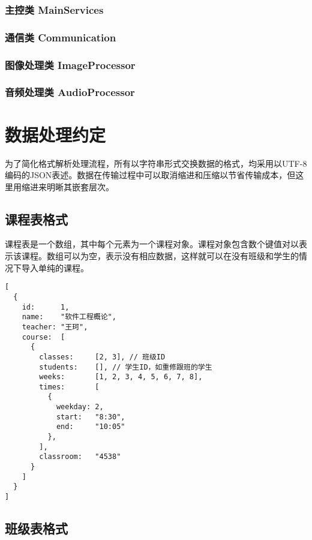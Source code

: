 \documentclass[cs4size,a4paper,nofonts]{ctexart}
\begin{document}
\subsubsection{主控类 MainServices}

\subsubsection{通信类 Communication}

\subsubsection{图像处理类 Image{}Processor}

\subsubsection{音频处理类 Audio{}Processor}

\section{数据处理约定}

为了简化格式解析处理流程，所有以字符串形式交换数据的格式，均采用以UTF-8编码的JSON表述。数据在传输过程中可以取消缩进和压缩以节省传输成本，但这里用缩进来明晰其嵌套层次。

\subsection{课程表格式}\label{sec:课程表格式}

课程表是一个数组，其中每个元素为一个课程对象。课程对象包含数个键值对以表示该课程。数组可以为空，表示没有相应数据，这样就可以在没有班级和学生的情况下导入单纯的课程。

\begin{Verbatim}
[
  {
    id:      1,
    name:    "软件工程概论",
    teacher: "王珂",
    course:  [
      {
        classes:     [2, 3], // 班级ID
        students:    [], // 学生ID，如重修跟班的学生
        weeks:       [1, 2, 3, 4, 5, 6, 7, 8],
        times:       [
          {
            weekday: 2,
            start:   "8:30",
            end:     "10:05"
          },
        ],
        classroom:   "4538"
      }
    ]
  }
]
\end{Verbatim}


\subsection{班级表格式}\label{sec:班级表格式}
\end{document}
